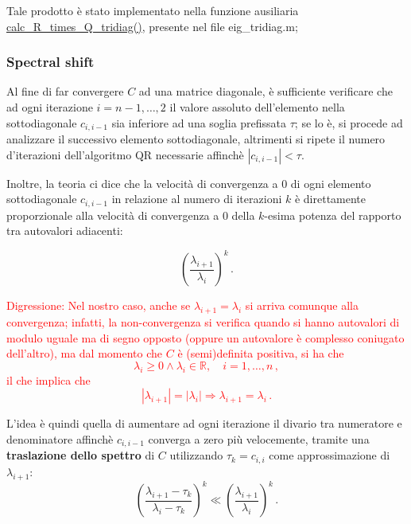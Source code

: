 Tale prodotto è stato implementato nella funzione ausiliaria \\
\href{https://github.com/Yagotzirck/svd_benchmark/blob/61d9bdf69b0431b83079c767cf2fc036bdc601a2/src/eig_tridiag.m#L60}{calc\_R\_times\_Q\_tridiag()}, 
presente nel file eig\_tridiag.m;

\subsubsection{Spectral shift}
Al fine di far convergere $C$ ad una matrice diagonale, è sufficiente verificare 
che ad ogni iterazione $i = n-1, \ldots, 2$ il valore assoluto dell'elemento 
nella sottodiagonale $c_{i,i-1}$ sia inferiore ad una soglia prefissata $\tau$; 
se lo è, si procede ad analizzare il successivo elemento sottodiagonale, 
altrimenti si ripete il numero d'iterazioni dell'algoritmo QR necessarie 
affinchè $|c_{i,i-1}| < \tau$.


Inoltre, la teoria ci dice che la velocità di convergenza a 0 di ogni elemento 
sottodiagonale $c_{i,i-1}$ in relazione al numero di iterazioni $k$ è 
direttamente proporzionale alla velocità di convergenza a 0 della $k$-esima 
potenza del rapporto tra autovalori adiacenti:

\begin{equation*}
	\left( \frac{\lambda_{i+1}}{\lambda_i} \right)^k \,.
\end{equation*}

\textcolor{red}{
Digressione: Nel nostro caso, anche se $\lambda_{i+1} = \lambda_i$ si arriva 
comunque alla convergenza; infatti, la non-convergenza si verifica quando si 
hanno autovalori di modulo uguale ma di segno opposto (oppure un autovalore è 
complesso coniugato dell'altro), ma dal momento che $C$ è (semi)definita 
positiva, si ha che
\begin{equation*}
	\lambda_i \geq 0 \wedge \lambda_i \in \mathbb{R}, \quad i = 1, \ldots, n \,,
\end{equation*}
il che implica che
\begin{equation*}
	|\lambda_{i+1}| = |\lambda_i| \Rightarrow \lambda_{i+1} = \lambda_i \,.
\end{equation*}
}

L'idea è quindi quella di aumentare ad ogni iterazione il divario tra numeratore 
e denominatore affinchè $c_{i,i-1}$ converga a zero più velocemente, tramite una 
\textbf{traslazione dello spettro} di $C$ utilizzando $\tau_k = c_{i,i}$ come 
approssimazione di $\lambda_{i+1}$:
\begin{equation*}
	\left( \frac{\lambda_{i+1} - \tau_k}{\lambda_i - \tau_k} \right)^k \ll \left( 
\frac{\lambda_{i+1}}{\lambda_i} \right)^k \,.
\end{equation*}

